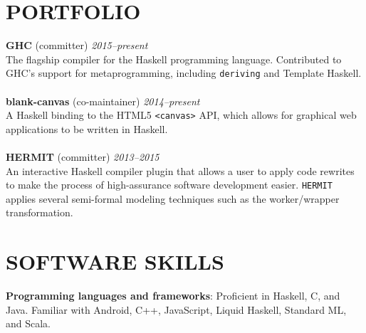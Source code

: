 \documentclass{res}
\begin{document}
\begin{resume}
\section{PORTFOLIO}
    \textbf{GHC} (committer) \hfill \textit{2015--present} \\
    The flagship compiler for the Haskell programming language. Contributed to GHC's support for metaprogramming, including \texttt{deriving} and Template Haskell. \\ \\
    \textbf{blank-canvas} (co-maintainer) \hfill \textit{2014--present} \\
    A Haskell binding to the HTML5 \texttt{<canvas>} API, which allows for graphical web applications to be written in Haskell. \\ \\
    \textbf{HERMIT} (committer) \hfill \textit{2013--2015} \\
    An interactive Haskell compiler plugin that allows a user to apply code rewrites to make the process of high-assurance software development easier. \verb+HERMIT+ applies several semi-formal modeling techniques such as the worker/wrapper transformation.

\section{SOFTWARE SKILLS}
    \textbf{Programming languages and frameworks}: Proficient in Haskell, C, and Java. Familiar with Android, C++, JavaScript, Liquid Haskell, Standard ML, and Scala.
\end{resume}
\end{document}
